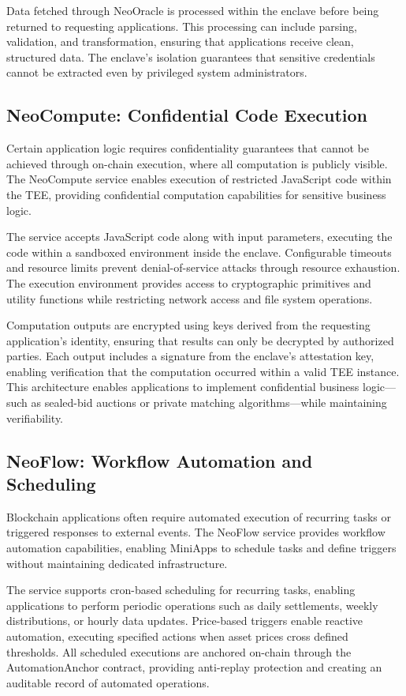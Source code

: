\documentclass[11pt,a4paper]{article}
\begin{document}
Data fetched through NeoOracle is processed within the enclave before being returned to requesting applications. This processing can include parsing, validation, and transformation, ensuring that applications receive clean, structured data. The enclave's isolation guarantees that sensitive credentials cannot be extracted even by privileged system administrators.

\subsection{NeoCompute: Confidential Code Execution}

Certain application logic requires confidentiality guarantees that cannot be achieved through on-chain execution, where all computation is publicly visible. The NeoCompute service enables execution of restricted JavaScript code within the TEE, providing confidential computation capabilities for sensitive business logic.

The service accepts JavaScript code along with input parameters, executing the code within a sandboxed environment inside the enclave. Configurable timeouts and resource limits prevent denial-of-service attacks through resource exhaustion. The execution environment provides access to cryptographic primitives and utility functions while restricting network access and file system operations.

Computation outputs are encrypted using keys derived from the requesting application's identity, ensuring that results can only be decrypted by authorized parties. Each output includes a signature from the enclave's attestation key, enabling verification that the computation occurred within a valid TEE instance. This architecture enables applications to implement confidential business logic---such as sealed-bid auctions or private matching algorithms---while maintaining verifiability.

\subsection{NeoFlow: Workflow Automation and Scheduling}

Blockchain applications often require automated execution of recurring tasks or triggered responses to external events. The NeoFlow service provides workflow automation capabilities, enabling MiniApps to schedule tasks and define triggers without maintaining dedicated infrastructure.

The service supports cron-based scheduling for recurring tasks, enabling applications to perform periodic operations such as daily settlements, weekly distributions, or hourly data updates. Price-based triggers enable reactive automation, executing specified actions when asset prices cross defined thresholds. All scheduled executions are anchored on-chain through the AutomationAnchor contract, providing anti-replay protection and creating an auditable record of automated operations.
\end{document}
